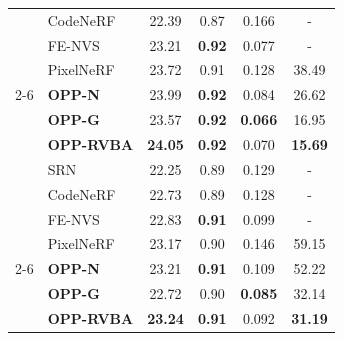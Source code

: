\begin{table}[t]
{\begin{tabular}{l|lcccc}
                                           & CodeNeRF                       & 22.39                           & 0.87                           & 0.166                      &    -               \\
                                           & FE-NVS                         & 23.21                           & \textbf{0.92}                           & 0.077                      &    -               \\ 
                                           & PixelNeRF                      & 23.72                           & 0.91                           & 0.128          & 38.49                  \\ \cline{2-6}
                                           & \textbf{OPP-N} & {23.99}      & \textbf{0.92}     & {0.084} & 26.62                   \\
                                           & \textbf{OPP-G} & {23.57}      & \textbf{0.92}     & \textbf{0.066} & 16.95                   \\
                                           & \textbf{OPP-RVBA} & \textbf{24.05}      & \textbf{0.92}     & {0.070} &
                \textbf{15.69} \\ \hline
{\multirow{7}{*}{Cars}} & SRN                            & 22.25                           & 0.89                           & 0.129                      &    -               \\
\multicolumn{1}{c|}{}                      & CodeNeRF                       & 22.73                           & 0.89                           & 0.128                      &       -            \\
\multicolumn{1}{c|}{}                      & FE-NVS                         & 22.83                           & \textbf{0.91} & 0.099                      &            -       \\
\multicolumn{1}{c|}{}                      & PixelNeRF                      & 23.17 & 0.90                           & 0.146                      &   59.15             \\ \cline{2-6}
\multicolumn{1}{c|}{}                      & \textbf{OPP-N} & {23.21}      &  \textbf{0.91}     & {0.109} &  52.22                 \\
\multicolumn{1}{c|}{}                      & \textbf{OPP-G} & {22.72}      & {0.90}     & \textbf{0.085} &   32.14               \\
\multicolumn{1}{c|}{}                      & \textbf{OPP-RVBA} & \textbf{23.24}      &  \textbf{0.91}     & {0.092} &    \textbf{31.19}              \\ \hline
\end{tabular}
    }
    

\end{table}
